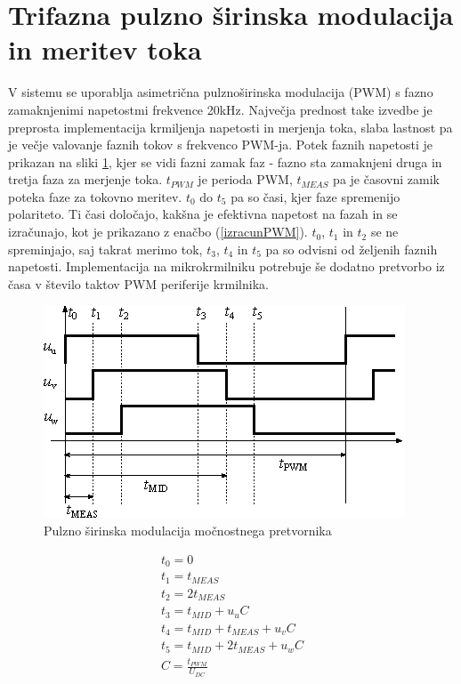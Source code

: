 \documentclass[a4paper,twoside,openright,12pt,slovene]{book}
\begin{document}
\section{Trifazna pulzno širinska modulacija in meritev toka}

V sistemu se uporablja asimetrična pulznoširinska modulacija (PWM) s fazno zamaknjenimi napetostmi frekvence 20kHz. Največja prednost take izvedbe je preprosta implementacija krmiljenja napetosti in merjenja toka, slaba lastnost pa je večje
valovanje faznih tokov s frekvenco PWM-ja. Potek faznih napetosti je prikazan na sliki \ref{PWM}, kjer se vidi fazni zamak faz - fazno sta zamaknjeni druga in tretja faza za merjenje toka. $t_{PWM}$
je perioda PWM, $t_{MEAS}$ pa je časovni zamik poteka faze za tokovno meritev. $t_0$ do $t_5$ pa so časi, kjer faze spremenijo polariteto. Ti časi določajo, kakšna je efektivna napetost na fazah in se
izračunajo, kot je prikazano z enačbo (\ref{izracunPWM}). $t_0$, $t_1$ in $t_2$ se ne spreminjajo, saj takrat merimo tok, $t_3$, $t_4$ in $t_5$ pa so odvisni od željenih faznih napetosti. Implementacija
na mikrokrmilniku potrebuje še dodatno pretvorbo iz časa v število taktov PWM periferije krmilnika.

\begin{figure}[!htbp]
    \centering
    \includegraphics[width=1\columnwidth]{Slike/Inkscape/PWM.eps}
    \caption{\label{PWM} Pulzno širinska modulacija močnostnega pretvornika }
\end{figure}

\begin{equation} \label{izracunPWM}
\begin{gathered}
    t_0 = 0  \\
    t_1 = t_{MEAS}  \\
    t_2 = 2t_{MEAS}  \\
    t_3 = t_{MID} + u_uC  \\
    t_4 = t_{MID} + t_{MEAS} + u_vC \\
    t_5 = t_{MID} + 2t_{MEAS} + u_wC \\
    C = \frac{t_{PWM}}{U_{DC}}
\end{gathered}
\end{equation}
\end{document}
